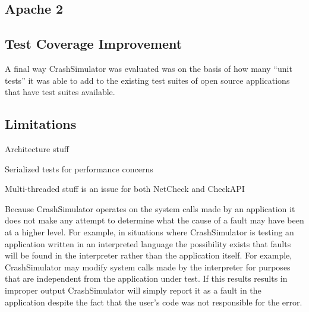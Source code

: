         \subsection{Apache 2}




    \subsection{Test Coverage Improvement}

        A final way CrashSimulator was evaluated was on the basis of how many ``unit tests'' it was able to add to the
        existing test suites of open source applications that have test suites available.

    \subsection{Limitations}

        Architecture stuff

        Serialized tests for performance concerns

        Multi-threaded stuff is an issue for both NetCheck and CheckAPI

        Because CrashSimulator operates on the system calls made by an application it does not make any attempt to
        determine what the cause of a fault may have been at a higher level. For example, in situations where
        CrashSimulator is testing an application written in an interpreted language the possibility exists that faults
        will be found in the interpreter rather than the application itself. For example, CrashSimulator may modify
        system calls made by the interpreter for purposes that are independent from the application under test.  If this
        results results in improper output CrashSimulator will simply report it as a fault in the application despite
        the fact that the user's code was not responsible for the error.
